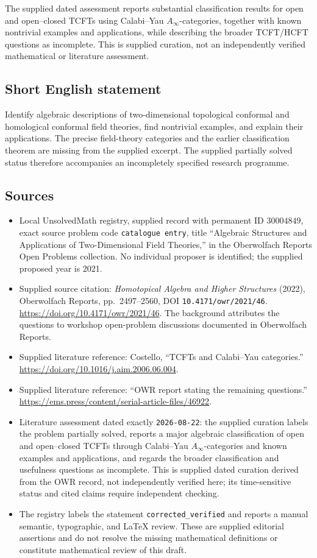 \documentclass[11pt]{article}
\begin{document}
The supplied dated assessment reports substantial classification results for open and open--closed TCFTs using Calabi--Yau \(A_\infty\)-categories, together with known nontrivial examples and applications, while describing the broader TCFT/HCFT questions as incomplete. This is supplied curation, not an independently verified mathematical or literature assessment.
\subsection{Short English statement}
Identify algebraic descriptions of two-dimensional topological conformal and homological conformal field theories, find nontrivial examples, and explain their applications. The precise field-theory categories and the earlier classification theorem are missing from the supplied excerpt. The supplied partially solved status therefore accompanies an incompletely specified research programme.
\subsection{Sources}
\begin{itemize}
\item Local UnsolvedMath registry, supplied record with permanent ID \(30004849\), exact source problem code \texttt{catalogue entry}, title ``Algebraic Structures and Applications of Two-Dimensional Field Theories,'' in the Oberwolfach Reports Open Problems collection. No individual proposer is identified; the supplied proposed year is 2021.
\item Supplied source citation: \emph{Homotopical Algebra and Higher Structures} (2022), Oberwolfach Reports, pp.\ 2497--2560, DOI \texttt{10.4171/owr/2021/46}. \url{https://doi.org/10.4171/owr/2021/46}. The background attributes the questions to workshop open-problem discussions documented in Oberwolfach Reports.
\item Supplied literature reference: Costello, ``TCFTs and Calabi--Yau categories.'' \url{https://doi.org/10.1016/j.aim.2006.06.004}.
\item Supplied literature reference: ``OWR report stating the remaining questions.'' \url{https://ems.press/content/serial-article-files/46922}.
\item Literature assessment dated exactly \texttt{2026-08-22}: the supplied curation labels the problem partially solved, reports a major algebraic classification of open and open--closed TCFTs through Calabi--Yau \(A_\infty\)-categories and known examples and applications, and regards the broader classification and usefulness questions as incomplete. This is supplied dated curation derived from the OWR record, not independently verified here; its time-sensitive status and cited claims require independent checking.
\item The registry labels the statement \texttt{corrected\_verified} and reports a manual semantic, typographic, and LaTeX review. These are supplied editorial assertions and do not resolve the missing mathematical definitions or constitute mathematical review of this draft.
\end{itemize}
\end{document}
